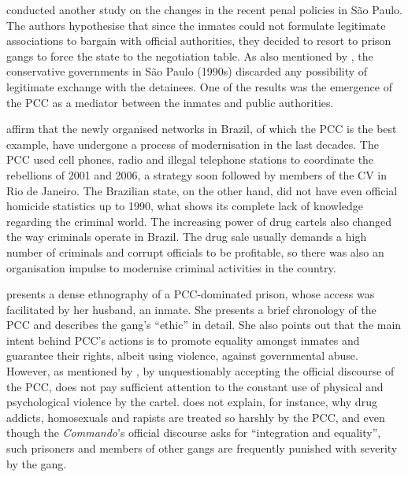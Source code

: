 \citet[]{alvarez2013comissoes} conducted another study on the changes in the recent penal policies in S\~{a}o Paulo. The authors hypothesise that since the inmates could not formulate legitimate associations to bargain with official authorities, they decided to resort to prison gangs to force the state to the negotiation table. As also mentioned by \citet[]{salla2007montoro}, the conservative governments in S\~{a}o Paulo (1990s) discarded any possibility of legitimate exchange with the detainees. One of the results was the emergence of the PCC as a mediator between the inmates and public authorities. 

\citet{adorno2007organized} affirm that the newly organised networks in Brazil, of which the PCC is the best example, have undergone a process of modernisation in the last decades. The PCC used cell phones, radio and illegal telephone stations to coordinate the rebellions of 2001 and 2006, a strategy soon followed by members of the CV in Rio de Janeiro. The Brazilian state, on the other hand, did not have even official homicide statistics up to 1990, what shows its complete lack of knowledge regarding the criminal world. The increasing power of drug cartels also changed the way criminals operate in Brazil. The drug sale usually demands a high number of criminals and corrupt officials to be profitable, so there was also an organisation impulse to modernise criminal activities in the country.

\citet[]{biondi2010junto} presents a dense ethnography of a PCC-dominated prison, whose access was facilitated by her husband, an inmate. She presents a brief chronology of the PCC and describes the gang's ``ethic'' in detail. She also points out that the main intent behind PCC's actions is to promote equality amongst inmates and guarantee their rights, albeit using violence, against governmental abuse. However, as mentioned by \citet[376]{dias2011pulverizaccao}, by unquestionably accepting the official discourse of the PCC, \citeauthor[]{biondi2010junto} does not pay sufficient attention to the constant use of physical and psychological violence by the cartel. \citeauthor[]{biondi2010junto} does not explain, for instance, why drug addicts, homosexuals and rapists are treated so harshly by the PCC, and even though the \textit{Commando}'s official discourse asks for ``integration and equality'', such prisoners and members of other gangs are frequently punished with severity by the gang. 

